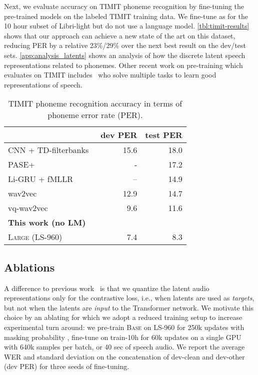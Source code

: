 \documentclass{article}
\newcommand{\wvppbase}{\textsc{Base}}
\newcommand{\wvppbig}{\textsc{Large}}
\newcommand{\libril}{Libri-light}
\newcommand{\librisz}{LS-960}
\begin{document}
Next, we evaluate accuracy on TIMIT phoneme recognition by fine-tuning the pre-trained models on the labeled TIMIT training data. 
We fine-tune as for the 10 hour subset of \libril{} but do not use a language model.
\autoref{tbl:timit-results} shows that our approach can achieve a new state of the art on this dataset, reducing PER by a relative 23\%/29\% over the next best result on the dev/test sets.
\autoref{app:analysis_latents} shows an analysis of how the discrete latent speech representations related to phonemes.
Other recent work on pre-training which evaluates on TIMIT includes~\citep{ravanelli2020pasep} who solve multiple tasks to learn good representations of speech.

\begin{table}
\caption{TIMIT phoneme recognition accuracy in terms of phoneme error rate (PER).
}
\label{tbl:timit-results}
\centering
\begin{tabular}{lrr}
\toprule
{} &   dev PER &  test PER \\
\midrule
CNN + TD-filterbanks~\citep{zeghidour2018filters} & 15.6 & 18.0 \\
PASE+~\citep{ravanelli2020pasep} & - & 17.2 \\
Li-GRU + fMLLR~\citep{ravanelli2018light} & -- & 14.9 \\ wav2vec~\citep{schneider2019wav2vec} & {12.9} & {14.7}  \\
vq-wav2vec~\citep{baevski2019vqwav2vec} & 9.6 & 11.6 \\
\midrule
\textbf{This work (no LM)} \\ 
\wvppbig{} (\librisz{}) & 7.4 & 8.3 \\
\bottomrule
\end{tabular}
\end{table}

\subsection{Ablations}
\label{sec:ablations}

A difference to previous work~\cite{baevski2019vqwav2vec,baevski2019effectiveness} is that we quantize the latent audio representations only for the contrastive loss, i.e., when latents are used as \emph{targets}, but not when the latents are \emph{input} to the Transformer network. 
We motivate this choice by an ablating for which we adopt a reduced training setup to increase experimental turn around: 
we pre-train \wvppbase{} on \librisz{} for 250k updates with masking probability , fine-tune on train-10h for 60k updates on a single GPU with 640k samples per batch, or 40 sec of speech audio.
We report the average WER and standard deviation on the concatenation of dev-clean and dev-other (dev PER) for three seeds of fine-tuning.
\end{document}
